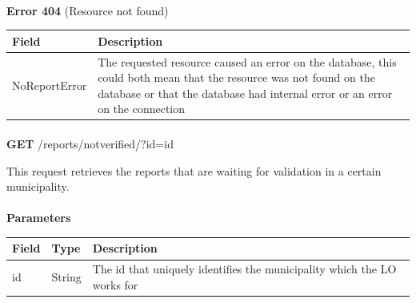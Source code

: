 						\paragraph{}
							\textbf{Error 404} (Resource not found)
							\begin{table}[!h]
								\begin{tabular}{L{0.4\textwidth}L{0.4\textwidth}}
									\toprule
									Field & Description \\
									\midrule
								  	 NoReportError & The requested resource caused an error on the database, this could both mean that the resource was not found on the database or that the database had internal error or an error on the connection \\
								 	\bottomrule
								\end{tabular}
							\end{table}
						
						\paragraph{}
						\textbf{GET} /reports/notverified/?id={id}
						
						This request retrieves the reports that are waiting for validation in a certain municipality.
						\paragraph{}
							\textbf{Parameters}
							\begin{table}[!h]
								\begin{tabular}{L{0.2\textwidth}L{0.2\textwidth}L{0.4\textwidth}}
									\toprule
									Field & Type & Description \\
									\midrule
								 	id & String & The id that uniquely identifies the municipality which the LO works for \\
								 	\bottomrule
								\end{tabular}
							\end{table}

